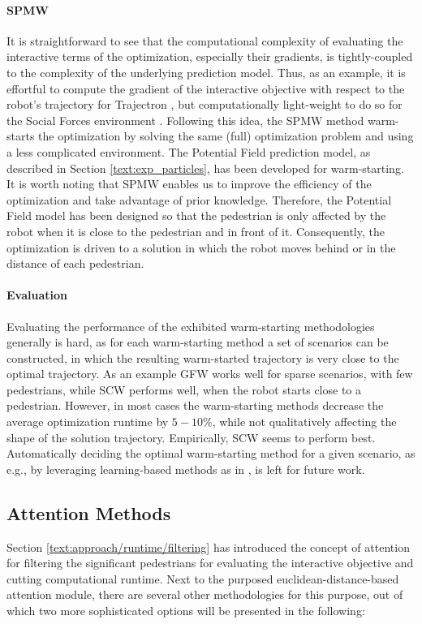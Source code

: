 \paragraph{\ac{SPMW}}
It is straightforward to see that the computational complexity of evaluating the interactive terms of the optimization, especially their gradients, is tightly-coupled to the complexity of the underlying prediction model. 
Thus, as an example, it is effortful to compute the gradient of the interactive objective with respect to the robot's trajectory for Trajectron \cite{Ivanovic2018}, but computationally light-weight to do so for the Social Forces environment \cite{Helbing1995}. Following this idea, the \ac{SPMW} method warm-starts the optimization by solving the same (full) optimization problem and using a less complicated environment. The Potential Field prediction model, as described in Section \ref{text:exp_particles}, has been developed for warm-starting. It is worth noting that \ac{SPMW} enables us to improve the efficiency of the optimization and take advantage of prior knowledge. Therefore, the Potential Field model has been designed so that the pedestrian is only affected by the robot when it is close to the pedestrian and in front of it. Consequently, the optimization is driven to a solution in which the robot moves behind or in the distance of each pedestrian.

\paragraph{Evaluation}
Evaluating the performance of the exhibited warm-starting methodologies generally is hard, as for each warm-starting method a set of scenarios can be constructed, in which the resulting warm-started trajectory is very close to the optimal trajectory. As an example \ac{GFW} works well for sparse scenarios, with few pedestrians, while \ac{SCW} performs well, when the robot starts close to a pedestrian. However, in most cases the warm-starting methods decrease the average optimization runtime by $5-10 \%$, while not qualitatively affecting the shape of the solution trajectory. Empirically, \ac{SCW} seems to perform best. Automatically deciding the optimal warm-starting method for a given scenario, as e.g., by leveraging learning-based methods as in \cite{Banerjee2020}, is left for future work.

\subsection{Attention Methods}
Section \ref{text:approach/runtime/filtering} has introduced the concept of attention for filtering the significant pedestrians for evaluating the interactive objective and cutting computational runtime. Next to the purposed euclidean-distance-based attention module, there are several other methodologies for this purpose, out of which two more sophisticated options will be presented in the following:

